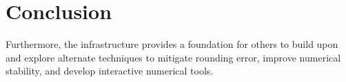 \documentclass[paper.tex]{subfiles}
\begin{document}
\section{Conclusion}
\label{sec:conclusion}

Furthermore, the \casio infrastructure provides a foundation for
others to build upon and explore alternate techniques to mitigate
rounding error, improve numerical stability, and develop interactive
numerical tools.
\end{document}
